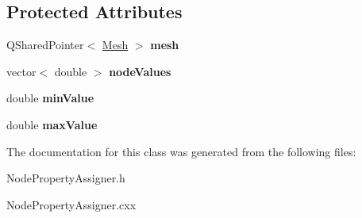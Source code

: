 \subsection*{Protected Attributes}
\begin{DoxyCompactItemize}
\item 
\hypertarget{class_node_property_assigner_a5b2038cb5cfbfaf6678dfa1c5a3809b7}{
QSharedPointer$<$ \hyperlink{class_mesh}{Mesh} $>$ {\bfseries mesh}}
\label{class_node_property_assigner_a5b2038cb5cfbfaf6678dfa1c5a3809b7}

\item 
\hypertarget{class_node_property_assigner_a18dac891ab2e1a4064bf9908b7ed004e}{
vector$<$ double $>$ {\bfseries nodeValues}}
\label{class_node_property_assigner_a18dac891ab2e1a4064bf9908b7ed004e}

\item 
\hypertarget{class_node_property_assigner_aec4c0fd35b507784291d408cecc59365}{
double {\bfseries minValue}}
\label{class_node_property_assigner_aec4c0fd35b507784291d408cecc59365}

\item 
\hypertarget{class_node_property_assigner_a1f26bb57f5f291c032327b35f418dda7}{
double {\bfseries maxValue}}
\label{class_node_property_assigner_a1f26bb57f5f291c032327b35f418dda7}

\end{DoxyCompactItemize}


The documentation for this class was generated from the following files:\begin{DoxyCompactItemize}
\item 
NodePropertyAssigner.h\item 
NodePropertyAssigner.cxx\end{DoxyCompactItemize}
